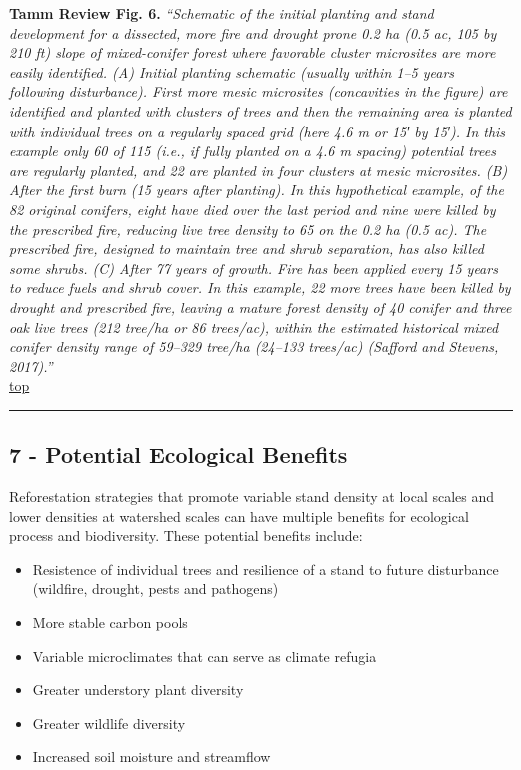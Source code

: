 \documentclass[]{article}
\begin{document}
 \textbf{Tamm Review Fig. 6.} \emph{``Schematic of the initial planting
and stand development for a dissected, more fire and drought prone 0.2
ha (0.5 ac, 105 by 210 ft) slope of mixed-conifer forest where favorable
cluster microsites are more easily identified. (A) Initial planting
schematic (usually within 1--5 years following disturbance). First more
mesic microsites (concavities in the figure) are identified and planted
with clusters of trees and then the remaining area is planted with
individual trees on a regularly spaced grid (here 4.6 m or 15′ by 15′).
In this example only 60 of 115 (i.e., if fully planted on a 4.6 m
spacing) potential trees are regularly planted, and 22 are planted in
four clusters at mesic microsites. (B) After the first burn (15 years
after planting). In this hypothetical example, of the 82 original
conifers, eight have died over the last period and nine were killed by
the prescribed fire, reducing live tree density to 65 on the 0.2 ha (0.5
ac). The prescribed fire, designed to maintain tree and shrub
separation, has also killed some shrubs. (C) After 77 years of growth.
Fire has been applied every 15 years to reduce fuels and shrub cover. In
this example, 22 more trees have been killed by drought and prescribed
fire, leaving a mature forest density of 40 conifer and three oak live
trees (212 tree/ha or 86 trees/ac), within the estimated historical
mixed conifer density range of 59--329 tree/ha (24--133 trees/ac)
(Safford and Stevens, 2017).''}\\

\protect\hyperlink{top}{top}

\begin{center}\rule{0.5\linewidth}{\linethickness}\end{center}

\hypertarget{Link7}{\subsection{7 - Potential Ecological
Benefits}\label{Link7}}

Reforestation strategies that promote variable stand density at local
scales and lower densities at watershed scales can have multiple
benefits for ecological process and biodiversity. These potential
benefits include:

\begin{itemize}
\item
  Resistence of individual trees and resilience of a stand to future
  disturbance (wildfire, drought, pests and pathogens)
\item
  More stable carbon pools
\item
  Variable microclimates that can serve as climate refugia
\item
  Greater understory plant diversity
\item
  Greater wildlife diversity
\item
  Increased soil moisture and streamflow
\end{itemize}
\end{document}
